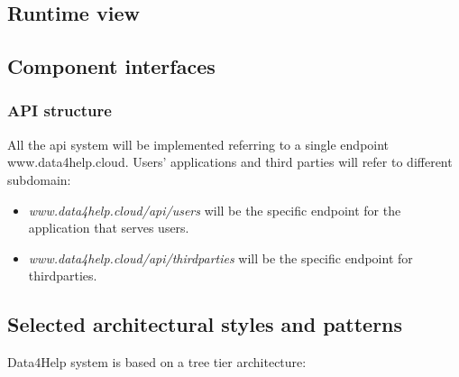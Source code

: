 \documentclass[DD.tex]{subfiles}
\begin{document}
\subsection{Runtime view}
\subsection{Component interfaces}
\subsubsection{API structure}

All the api system will be implemented referring to a single endpoint www.data4help.cloud. Users' applications and third parties will refer to different subdomain:

\begin{itemize}
	\item \textit{www.data4help.cloud/api/users} will be the specific endpoint for the application that serves users.
	\item \textit{www.data4help.cloud/api/thirdparties} will be the specific endpoint for thirdparties.
\end{itemize}

\newpage
\subsection{Selected architectural styles and patterns}
Data4Help system is based on a tree tier architecture:
\end{document}
